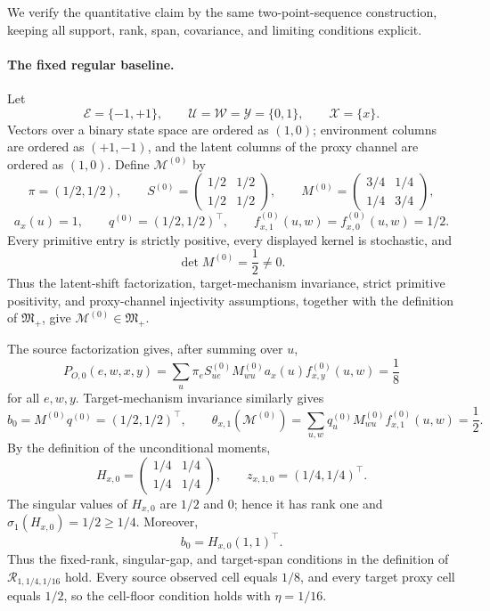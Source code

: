 We verify the quantitative claim by the same two-point-sequence construction, keeping all support, rank, span, covariance, and limiting conditions explicit.

\paragraph{The fixed regular baseline.}
Let
\[
\mathcal E=\{-1,+1\},\qquad
\mathcal U=\mathcal W=\mathcal Y=\{0,1\},\qquad
\mathcal X=\{x\}.
\]
Vectors over a binary state space are ordered as \((1,0)\); environment columns are ordered as \((+1,-1)\), and the latent columns of the proxy channel are ordered as \((1,0)\). Define \(\mathcal M^{(0)}\) by
\[
\pi=(1/2,1/2),\qquad
S^{(0)}=
\begin{pmatrix}1/2&1/2\\1/2&1/2\end{pmatrix},\qquad
M^{(0)}=
\begin{pmatrix}3/4&1/4\\1/4&3/4\end{pmatrix},
\]
\[
a_x(u)=1,\qquad q^{(0)}=(1/2,1/2)^{\top},\qquad
f^{(0)}_{x,1}(u,w)=f^{(0)}_{x,0}(u,w)=1/2.
\]
Every primitive entry is strictly positive, every displayed kernel is stochastic, and
\[
\det M^{(0)}=\frac12\ne0.
\]
Thus the latent-shift factorization, target-mechanism invariance, strict primitive positivity, and proxy-channel injectivity assumptions, together with the definition of \(\mathfrak M_{+}\), give \(\mathcal M^{(0)}\in\mathfrak M_{+}\).

The source factorization gives, after summing over \(u\),
\[
P_{O,0}(e,w,x,y)=\sum_{u}\pi_eS^{(0)}_{ue}M^{(0)}_{wu}a_x(u)f^{(0)}_{x,y}(u,w)=\frac18
\]
for all \(e,w,y\). Target-mechanism invariance similarly gives
\[
b_0=M^{(0)}q^{(0)}=(1/2,1/2)^{\top},
\qquad
\theta_{x,1}(\mathcal M^{(0)})
=\sum_{u,w}q^{(0)}_uM^{(0)}_{wu}f^{(0)}_{x,1}(u,w)=\frac12.
\]
By the definition of the unconditional moments,
\[
H_{x,0}=
\begin{pmatrix}1/4&1/4\\1/4&1/4\end{pmatrix},
\qquad
z_{x,1,0}=(1/4,1/4)^{\top}.
\]
The singular values of \(H_{x,0}\) are \(1/2\) and \(0\); hence it has rank one and \(\sigma_1(H_{x,0})=1/2\ge1/4\). Moreover,
\[
b_0=H_{x,0}(1,1)^{\top}.
\]
Thus the fixed-rank, singular-gap, and target-span conditions in the definition of \(\mathcal R_{1,1/4,1/16}\) hold. Every source observed cell equals \(1/8\), and every target proxy cell equals \(1/2\), so the cell-floor condition holds with \(\eta=1/16\).

